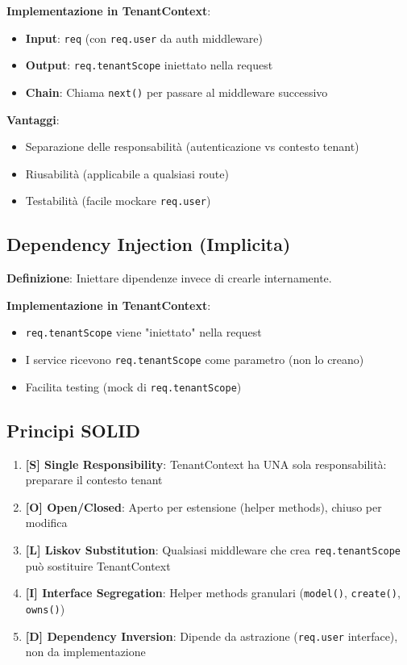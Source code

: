 \documentclass[11pt,a4paper]{article}
\begin{document}
\textbf{Implementazione in TenantContext}:
\begin{itemize}
    \item \textbf{Input}: \texttt{req} (con \texttt{req.user} da auth middleware)
    \item \textbf{Output}: \texttt{req.tenantScope} iniettato nella request
    \item \textbf{Chain}: Chiama \texttt{next()} per passare al middleware successivo
\end{itemize}

\textbf{Vantaggi}:
\begin{itemize}
    \item Separazione delle responsabilità (autenticazione vs contesto tenant)
    \item Riusabilità (applicabile a qualsiasi route)
    \item Testabilità (facile mockare \texttt{req.user})
\end{itemize}

\subsection{Dependency Injection (Implicita)}

\textbf{Definizione}: Iniettare dipendenze invece di crearle internamente.

\textbf{Implementazione in TenantContext}:
\begin{itemize}
    \item \texttt{req.tenantScope} viene "iniettato" nella request
    \item I service ricevono \texttt{req.tenantScope} come parametro (non lo creano)
    \item Facilita testing (mock di \texttt{req.tenantScope})
\end{itemize}

\subsection{Principi SOLID}

\begin{enumerate}
    \item \textbf{[S] Single Responsibility}: TenantContext ha UNA sola responsabilità: preparare il contesto tenant
    \item \textbf{[O] Open/Closed}: Aperto per estensione (helper methods), chiuso per modifica
    \item \textbf{[L] Liskov Substitution}: Qualsiasi middleware che crea \texttt{req.tenantScope} può sostituire TenantContext
    \item \textbf{[I] Interface Segregation}: Helper methods granulari (\texttt{model()}, \texttt{create()}, \texttt{owns()})
    \item \textbf{[D] Dependency Inversion}: Dipende da astrazione (\texttt{req.user} interface), non da implementazione
\end{enumerate}
\end{document}
